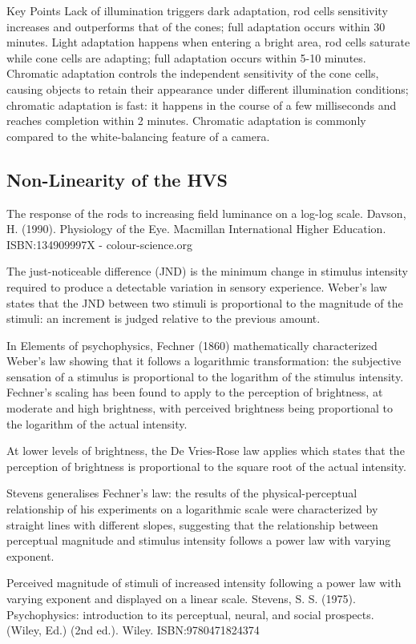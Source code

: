 Key Points
Lack of illumination triggers dark adaptation, rod cells sensitivity increases and outperforms that of the cones; full adaptation occurs within 30 minutes.
Light adaptation happens when entering a bright area, rod cells saturate while cone cells are adapting;  full adaptation occurs within 5-10 minutes.
Chromatic adaptation controls the independent sensitivity of the cone cells, causing objects to retain their appearance under different illumination conditions; chromatic adaptation is fast: it happens in the course of a few milliseconds and reaches completion within 2 minutes.
Chromatic adaptation is commonly compared to the white-balancing feature of a camera.

\subsection{Non-Linearity of the HVS}

The response of the rods to increasing field luminance on a log-log scale. Davson, H. (1990). Physiology of the Eye. Macmillan International Higher Education. ISBN:134909997X - colour-science.org

The just-noticeable difference (JND) is the minimum change in stimulus intensity required to produce a detectable variation in sensory experience. Weber's law states that the JND between two stimuli is proportional to the magnitude of the stimuli: an increment is judged relative to the previous amount.

In Elements of psychophysics, Fechner (1860) mathematically characterized Weber’s law showing that it follows a logarithmic transformation: the subjective sensation of a stimulus is proportional to the logarithm of the stimulus intensity. Fechner’s scaling has been found to apply to the perception of brightness, at moderate and high brightness, with perceived brightness being proportional to the logarithm of the actual intensity. 

At lower levels of brightness, the De Vries-Rose law applies which states that the perception of brightness is proportional to the square root of the actual intensity. 

Stevens generalises Fechner's law: the results of the physical-perceptual relationship of his experiments on a logarithmic scale were characterized by straight lines with different slopes, suggesting that the relationship between perceptual magnitude and stimulus intensity follows a power law with varying exponent.


Perceived magnitude of stimuli of increased intensity following a power law with varying exponent and displayed on a linear scale. Stevens, S. S. (1975). Psychophysics: introduction to its perceptual, neural, and social prospects. (Wiley, Ed.) (2nd ed.). Wiley. ISBN:9780471824374 

